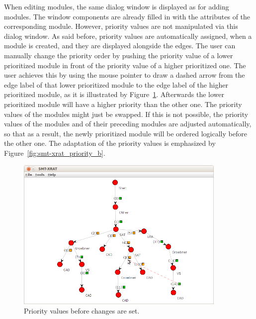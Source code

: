 When editing modules, the same dialog window is displayed as for adding modules.
The window components are already filled in with the attributes of the corresponding
module. However, priority values are not manipulated via this dialog window. As said before,
priority values are automatically assigned, when a module is created, and they are 
displayed alongside the edges. The user can manually change the priority order by 
pushing the priority value of a lower prioritized module in front of the priority
value of a higher prioritized one. The user achieves this by using the mouse pointer
to draw a dashed arrow from the edge label of that lower prioritized module to the
edge label of the higher prioritized module, as it is illustrated by Figure~\ref{fig:smt-xrat_priority_a}. Afterwards the lower prioritized module will have a higher
priority than the other one. The priority values of the modules might just be swapped.
If this is not possible, the priority values of the modules and of their preceding modules
are adjusted automatically, so that as a result, the newly prioritized module will be
ordered logically before the other one. The adaptation of the priority values is
emphasized by Figure~\ref{fig:smt-xrat_priority_b}.
\begin{figure}
  \begin{center}
    \includegraphics[width=0.9\textwidth]{graphics/smt-xrat_priority_a.png}
  \end{center}
  \caption{Priority values before changes are set.}
  \label{fig:smt-xrat_priority_a}
\end{figure}

